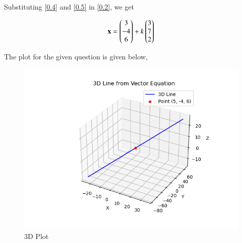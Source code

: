\documentclass[journal]{IEEEtran}
\begin{document}
Substituting \ref{0.4} and \ref{0.5} in \ref{0.2}, we get

\begin{align}
    \textbf{x} = \begin{pmatrix}3\\-4\\6\end{pmatrix} + k\begin{pmatrix}3\\7\\2\end{pmatrix}
    \label{0.6}
\end{align}

The plot for the given question is given below,

\begin{figure}[H]
    \centering
    \includegraphics[width=0.8\columnwidth]{figs/fig1.png}
    \caption{3D Plot}
    \label{3D Plot}
\end{figure}
\end{document}
